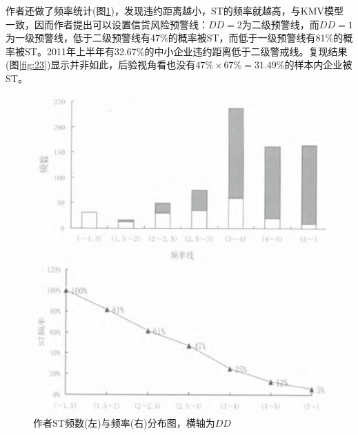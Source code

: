 \documentclass[a4paper,12pt]{ctexart}
\begin{document}
作者还做了频率统计(图\ref{fig:origin23})，发现违约距离越小，ST的频率就越高，与KMV模型一致，因而作者提出可以设置信贷风险预警线：$DD=2$为二级预警线，而$DD=1$为一级预警线，低于二级预警线有47\%的概率被ST，而低于一级预警线有81\%的概率被ST。2011年上半年有32.67\%的中小企业违约距离低于二级警戒线。复现结果(图\ref{fig:23})显示并非如此，后验视角看也没有$47\%\times 67\% = 31.49\%$的样本内企业被ST。
\begin{figure}[H]
    \begin{minipage}{0.48\linewidth}
        \includegraphics[width=\linewidth]{img/fig2.jpeg}
    \end{minipage}
    \begin{minipage}{0.48\linewidth}
        \includegraphics[width=\linewidth]{img/fig3.jpeg}
    \end{minipage}
    \caption{作者ST频数(左)与频率(右)分布图，横轴为$DD$}\label{fig:origin23}
\end{figure}
\end{document}
